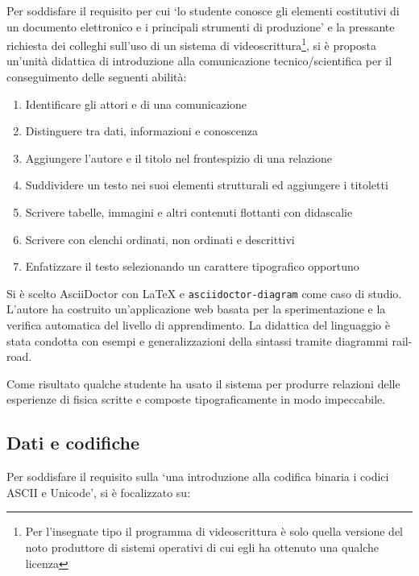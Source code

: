\documentclass[a4paper]{easychair}
\begin{document}
Per soddisfare il requisito per cui `lo studente conosce gli elementi costitutivi
di un documento elettronico e i principali strumenti di produzione' e la
pressante richiesta dei colleghi sull'uso di un sistema di videoscrittura\footnote{Per
l'insegnate tipo il programma di videoscrittura è solo quella versione del noto produttore
di sistemi operativi di cui egli ha ottenuto una qualche licenza}, si è proposta un'unità
didattica di introduzione alla comunicazione tecnico/scientifica per il conseguimento
delle seguenti abilità:

\begin{enumerate}
\item
  Identificare gli attori e di una comunicazione
\item
  Distinguere tra dati, informazioni e conoscenza
\item
  Aggiungere l'autore e il titolo nel frontespizio di una relazione
\item
  Suddividere un testo nei suoi elementi strutturali ed aggiungere i
  titoletti
\item
  Scrivere tabelle, immagini e altri contenuti flottanti con didascalie
\item
  Scrivere con elenchi ordinati, non ordinati e descrittivi
\item
  Enfatizzare il testo selezionando un carattere tipografico opportuno
\end{enumerate}

Si è scelto AsciiDoctor\cite{asciidoctor} con \LaTeX{} e \texttt{asciidoctor-diagram} come caso di studio.
L'autore ha costruito un'applicazione web basata per
la sperimentazione e la verifica automatica del livello di apprendimento.
La didattica del linguaggio è stata condotta con esempi e generalizzazioni
della sintassi tramite diagrammi rail-road.

Come risultato qualche studente ha usato il sistema per produrre
relazioni delle esperienze di fisica scritte e composte tipograficamente
in modo impeccabile.

\subsection[Dati e codifiche]{Dati e codifiche} 

Per soddisfare il requisito sulla `\textellipsis una introduzione alla codifica binaria
\textellipsis i codici ASCII e Unicode', si è focalizzato su:
\end{document}
